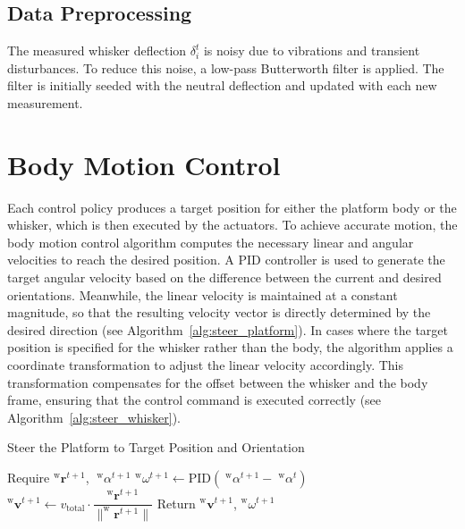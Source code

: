\subsection{Data Preprocessing}

The measured whisker deflection \(\delta_{i}^{t}\) is noisy due to vibrations and transient disturbances.
To reduce this noise, a low-pass Butterworth filter is applied.
The filter is initially seeded with the neutral deflection and updated with each new measurement.


\section{Body Motion Control}

Each control policy produces a target position for either the platform body or the whisker, which is then executed by the actuators.
To achieve accurate motion, the body motion control algorithm computes the necessary linear and angular velocities to reach the desired position.
A PID controller is used to generate the target angular velocity based on the difference between the current and desired orientations.
Meanwhile, the linear velocity is maintained at a constant magnitude, so that the resulting velocity vector is directly determined by the desired direction (see Algorithm~\ref{alg:steer_platform}).
In cases where the target position is specified for the whisker rather than the body, the algorithm applies a coordinate transformation to adjust the linear velocity accordingly.
This transformation compensates for the offset between the whisker and the body frame, ensuring that the control command is executed correctly (see Algorithm~\ref{alg:steer_whisker}).


\begin{algorithm}[htb]
    \caption{Steer the Platform to Target Position and Orientation}
    \begin{algorithmic}[1]
        \State Require \(^{\mathrm{w}}\boldsymbol{r}^{t+1}\), \(\;^{\mathrm{w}}\alpha^{t+1}\)
        \State \(^{\mathrm{w}}\omega^{t+1} \gets \mathrm{PID}(\;^{\mathrm{w}}\alpha^{t+1} - \;^{\mathrm{w}}\alpha^{t})\)
        \State \(^{\mathrm{w}}\boldsymbol{v}^{t+1} \gets v_{\mathrm{total}} \cdot \dfrac{^{\mathrm{w}}\boldsymbol{r}^{t+1}}{\|^{\mathrm{w}}\boldsymbol{r}^{t+1}\|}\)
        \State Return \(^{\mathrm{w}}\boldsymbol{v}^{t+1}\), \(^{\mathrm{w}}\omega^{t+1}\)
    \end{algorithmic}
    \label{alg:steer_platform}
\end{algorithm}

